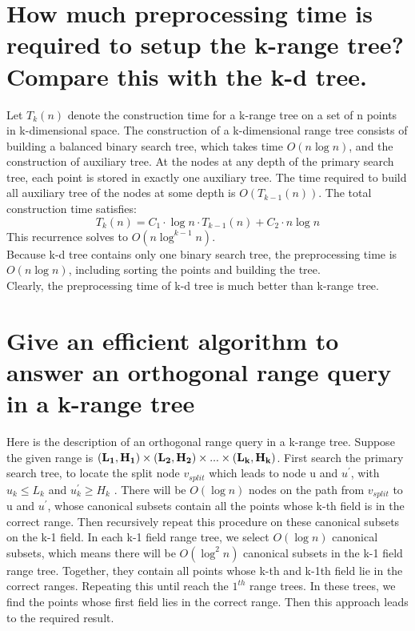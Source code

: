 \documentclass{report}
\begin{document}
\section{How much preprocessing time is required to setup the k-range tree? Compare this with the k-d tree.}
Let $T_k(n)$ denote the construction time for a k-range tree on a set of n points in k-dimensional space. The construction of a k-dimensional range tree consists of building a balanced binary search tree, which takes time $O(n\log n)$, and the construction of auxiliary tree. At the nodes at any depth of the primary search tree, each point is stored in exactly one auxiliary tree. The time required to build all auxiliary tree of the nodes at some depth is $O(T_{k-1}(n))$. The total construction time satisfies:
$$
T_k(n) = C_{1} \cdot \log n \cdot T_{k-1}(n) + C_{2} \cdot n\log n
$$
This recurrence solves to $O(n\log^{k-1} n)$. \\
Because k-d tree contains only one binary search tree, the preprocessing time is $O(n\log n)$, including sorting the points and building the tree. \\
Clearly, the preprocessing time of k-d tree is much better than k-range tree.

\section{Give an efficient algorithm to answer an orthogonal range query in a k-range tree}
Here is the description of an orthogonal range query in a k-range tree. Suppose the given range is $\bf (L_1, H_1) \times (L_2, H_2) \times ... \times (L_k, H_k) $. First search the primary search tree, to locate the split node $v_{split}$ which leads to node u and $u^{'}$, with $u_{k} \leq L_{k}$ and $u_{k}^{'} \geq H_{k}$ . There will be $O(\log n)$ nodes on the path from $v_{split}$ to u and $u^{'}$, whose canonical subsets contain all the points whose k-th field is in the correct range. Then recursively repeat this procedure on these canonical subsets on the k-1 field. In each k-1 field range tree, we select $O(\log n)$ canonical subsets, which means there will be $O(\log^{2} n)$ canonical subsets in the k-1 field range tree. Together, they contain all points whose k-th and k-1th field lie in the correct ranges. Repeating this until reach the $1^{th}$ range trees. In these trees, we find the points whose first field lies in the correct range. Then this approach leads to the required result.
\end{document}
